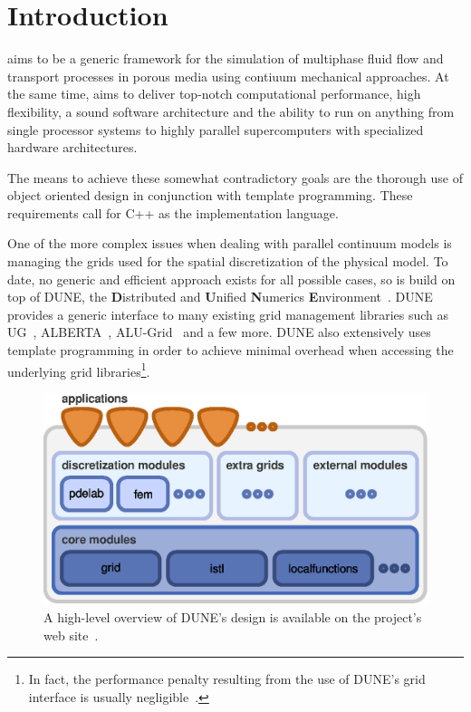 \chapter{Introduction}

\Dumux aims to be a generic framework for the simulation of multiphase
fluid flow and transport processes in porous media using contiuum
mechanical approaches.  At the same time, \Dumux aims to deliver
top-notch computational performance, high flexibility, a sound
software architecture and the ability to run on anything from single
processor systems to highly parallel supercomputers with specialized
hardware architectures.

The means to achieve these somewhat contradictory goals are the
thorough use of object oriented design in conjunction with template
programming. These requirements call for C++ as the implementation
language.

One of the more complex issues when dealing with parallel continuum
models is managing the grids used for the spatial discretization of
the physical model. To date, no generic and efficient approach exists
for all possible cases, so \Dumux is build on top of DUNE, the
\textbf{D}istributed and \textbf{U}nified \textbf{N}umerics
\textbf{E}nvironment~\cite{DUNE-HP}. DUNE provides a generic interface
to many existing grid management libraries such as UG~\cite{UG-HP},
ALBERTA~\cite{ALBERTA-HP}, ALU-Grid~\cite{ALUGRID-HP} and a few
more. DUNE also extensively uses template programming in order to
achieve minimal overhead when accessing the underlying grid
libraries\footnote{In fact, the performance penalty resulting from the
  use of DUNE's grid interface is usually
  negligible~\cite{BURRI2006}.}.
\begin{figure}[hbt]
  \centering 
  \includegraphics[width=.5\linewidth, keepaspectratio]{EPS/dunedesign}
  \caption{
    \label{fig:dune-design}
    A high-level overview of DUNE's design is available on the project's
    web site~\cite{DUNE-HP}.
  }
\end{figure}

